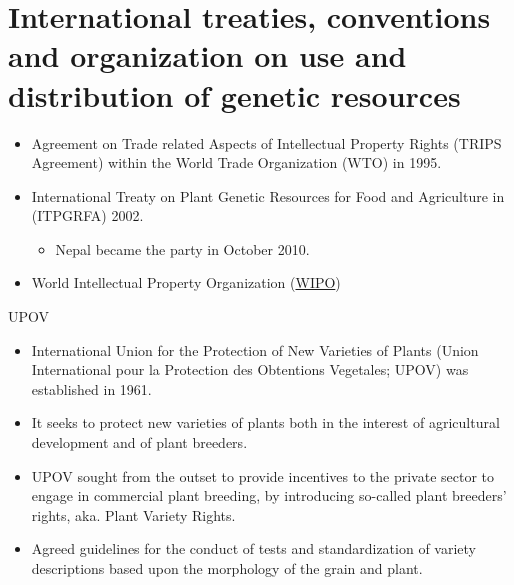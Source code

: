 \documentclass[
  ignorenonframetext,
  aspectratio=169]{beamer}
\providecommand{\tightlist}{%
  \setlength{\itemsep}{0pt}\setlength{\parskip}{0pt}}
\begin{document}
\hypertarget{international-treaties-conventions-and-organization-on-use-and-distribution-of-genetic-resources}{%
\section{International treaties, conventions and organization on use and
distribution of genetic
resources}\label{international-treaties-conventions-and-organization-on-use-and-distribution-of-genetic-resources}}

\begin{frame}{}
\protect\hypertarget{section-5}{}
\begin{itemize}
\tightlist
\item
  Agreement on Trade related Aspects of Intellectual Property Rights
  (TRIPS Agreement) within the World Trade Organization (WTO) in 1995.
\item
  International Treaty on Plant Genetic Resources for Food and
  Agriculture in (ITPGRFA) 2002.

  \begin{itemize}
  \tightlist
  \item
    Nepal became the party in October 2010.
  \end{itemize}
\item
  World Intellectual Property Organization
  (\href{https://www.wipo.int/portal/en/index.html}{WIPO})
\end{itemize}
\end{frame}

\begin{frame}{UPOV}
\protect\hypertarget{upov}{}
\begin{itemize}
\tightlist
\item
  International Union for the Protection of New Varieties of Plants
  (Union International pour la Protection des Obtentions Vegetales;
  UPOV) was established in 1961.
\item
  It seeks to protect new varieties of plants both in the interest of
  agricultural development and of plant breeders.
\item
  UPOV sought from the outset to provide incentives to the private
  sector to engage in commercial plant breeding, by introducing
  so-called plant breeders' rights, aka. Plant Variety Rights.
\item
  Agreed guidelines for the conduct of tests and standardization of
  variety descriptions based upon the morphology of the grain and plant.
\end{itemize}
\end{frame}
\end{document}
